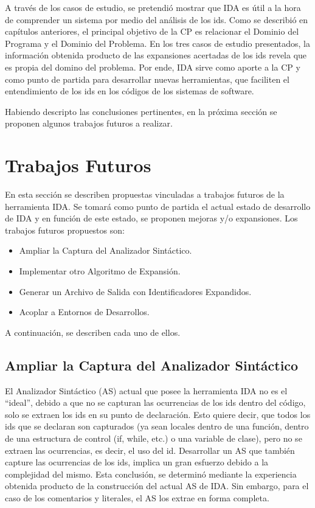 A través de los casos de estudio, se pretendió mostrar que IDA es útil a la hora de comprender un sistema por medio del análisis de los ids. Como se describió en capítulos anteriores, el principal objetivo de la CP es relacionar el Dominio del Programa y el Dominio del Problema. En los tres casos de estudio presentados, la información obtenida producto de las expansiones acertadas de los ids revela que es propia del domino del problema. Por ende, IDA sirve como aporte a la CP y como punto de partida para desarrollar nuevas herramientas, que faciliten el entendimiento de los ids en los códigos de los sistemas de software.

Habiendo descripto las conclusiones pertinentes, en la próxima sección se proponen algunos trabajos futuros a realizar.

\section{Trabajos Futuros}

En esta sección se describen propuestas vinculadas a trabajos futuros de la herramienta IDA. Se tomará como punto de partida el actual estado de desarrollo de IDA y en función de este estado, se proponen mejoras y/o expansiones. Los trabajos futuros propuestos son:

\begin{itemize}

\item Ampliar la Captura del Analizador Sintáctico.

\item Implementar otro Algoritmo de Expansión.

\item Generar un Archivo de Salida con Identificadores Expandidos.

\item Acoplar a Entornos de Desarrollos.

\end{itemize}

A continuación, se describen cada uno de ellos.

\subsection{Ampliar la Captura del Analizador Sintáctico}

El Analizador Sintáctico (AS) actual que posee la herramienta IDA no es el “ideal”, debido a que no se capturan las ocurrencias de los ids dentro del código, solo se extraen los ids en su punto de declaración. Esto quiere decir, que todos los ids que se declaran son capturados (ya sean locales dentro de una función, dentro de una estructura de control (if, while, etc.) o una variable de clase), pero no se extraen las ocurrencias, es decir, el uso del id. Desarrollar un AS que también capture las ocurrencias de los ids, implica un gran esfuerzo debido a la complejidad del mismo. Esta conclusión, se determinó mediante la experiencia obtenida producto de la construcción del actual AS de IDA. Sin embargo, para el caso de los comentarios y literales, el AS los extrae en forma completa. 

